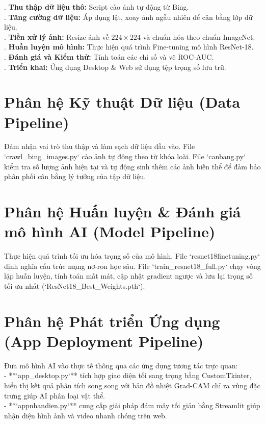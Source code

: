 \documentclass[12pt,a4paper]{report}
\begin{document}
. \textbf{Thu thập dữ liệu thô:} Script cào ảnh tự động từ Bing.\\[0.15cm]
. \textbf{Tăng cường dữ liệu:} Áp dụng lật, xoay ảnh ngẫu nhiên để cân bằng lớp dữ liệu.\\[0.15cm]
. \textbf{Tiền xử lý ảnh:} Resize ảnh về $224 \times 224$ và chuẩn hóa theo chuẩn ImageNet.\\[0.15cm]
. \textbf{Huấn luyện mô hình:} Thực hiện quá trình Fine-tuning mô hình ResNet-18.\\[0.15cm]
. \textbf{Đánh giá và Kiểm thử:} Tính toán các chỉ số và vẽ ROC-AUC.\\[0.15cm]
. \textbf{Triển khai:} Ứng dụng Desktop \& Web sử dụng tệp trọng số lưu trữ.

\section{Phân hệ Kỹ thuật Dữ liệu (Data Pipeline)}
Đảm nhận vai trò thu thập và làm sạch dữ liệu đầu vào. File `crawl_bing_images.py` cào ảnh tự động theo từ khóa loài. File `canbang.py` kiểm tra số lượng ảnh hiện tại và tự động sinh thêm các ảnh biến thể để đảm bảo phân phối cân bằng lý tưởng của tập dữ liệu.

\section{Phân hệ Huấn luyện & Đánh giá mô hình AI (Model Pipeline)}
Thực hiện quá trình tối ưu hóa trọng số của mô hình. File `resnet18finetuning.py` định nghĩa cấu trúc mạng nơ-ron học sâu. File `train_resnet18_full.py` chạy vòng lặp huấn luyện, tính toán mất mát, cập nhật gradient ngược và lưu lại trọng số tối ưu nhất (`ResNet18_Best_Weights.pth`).

\section{Phân hệ Phát triển Ứng dụng (App Deployment Pipeline)}
Đưa mô hình AI vào thực tế thông qua các ứng dụng tương tác trực quan:\\

\noindent - **`app_desktop.py`** tích hợp giao diện tối sang trọng bằng CustomTkinter, hiển thị kết quả phân tích song song với bản đồ nhiệt Grad-CAM chỉ ra vùng đặc trưng giúp AI phân loại vật thể.\\[0.15cm]
\noindent - **`appnhandien.py`** cung cấp giải pháp đám mây tối giản bằng Streamlit giúp nhận diện hình ảnh và video nhanh chóng trên web.
\newpage
\end{document}
